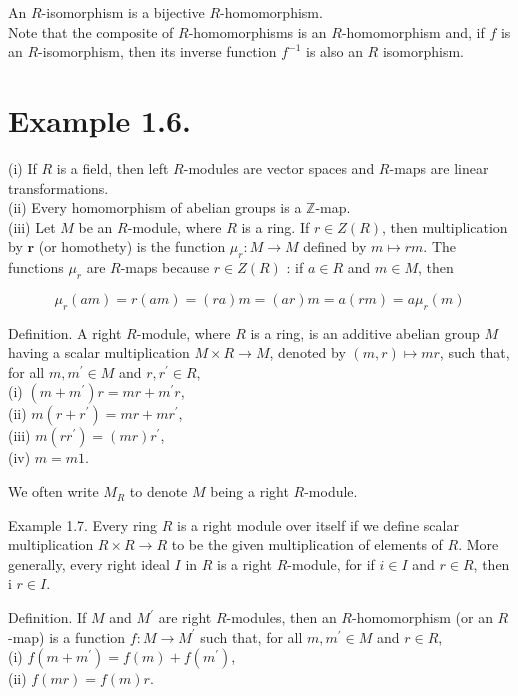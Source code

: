 \documentclass[10pt, letterpaper]{article}
\begin{document}
An $R$-isomorphism is a bijective $R$-homomorphism.\\
Note that the composite of $R$-homomorphisms is an $R$-homomorphism and, if $f$ is an $R$-isomorphism, then its inverse function $f^{-1}$ is also an $R$ isomorphism.

\section*{Example 1.6.}
(i) If $R$ is a field, then left $R$-modules are vector spaces and $R$-maps are linear transformations.\\
(ii) Every homomorphism of abelian groups is a $\mathbb{Z}$-map.\\
(iii) Let $M$ be an $R$-module, where $R$ is a ring. If $r \in Z(R)$, then multiplication by $\boldsymbol{r}$ (or homothety) is the function $\mu_{r}: M \rightarrow M$ defined by $m \mapsto r m$. The functions $\mu_{r}$ are $R$-maps because $r \in Z(R)$ : if $a \in R$ and $m \in M$, then

$$
\mu_{r}(a m)=r(a m)=(r a) m=(a r) m=a(r m)=a \mu_{r}(m)
$$

Definition. A right $R$-module, where $R$ is a ring, is an additive abelian group $M$ having a scalar multiplication $M \times R \rightarrow M$, denoted by $(m, r) \mapsto m r$, such that, for all $m, m^{\prime} \in M$ and $r, r^{\prime} \in R$,\\
(i) $\left(m+m^{\prime}\right) r=m r+m^{\prime} r$,\\
(ii) $m\left(r+r^{\prime}\right)=m r+m r^{\prime}$,\\
(iii) $m\left(r r^{\prime}\right)=(m r) r^{\prime}$,\\
(iv) $m=m 1$.

We often write $M_{R}$ to denote $M$ being a right $R$-module.

Example 1.7. Every ring $R$ is a right module over itself if we define scalar multiplication $R \times R \rightarrow R$ to be the given multiplication of elements of $R$. More generally, every right ideal $I$ in $R$ is a right $R$-module, for if $i \in I$ and $r \in R$, then i $r \in I$.

Definition. If $M$ and $M^{\prime}$ are right $R$-modules, then an $R$-homomorphism (or an $R$-map) is a function $f: M \rightarrow M^{\prime}$ such that, for all $m, m^{\prime} \in M$ and $r \in R$,\\
(i) $f\left(m+m^{\prime}\right)=f(m)+f\left(m^{\prime}\right)$,\\
(ii) $f(m r)=f(m) r$.
\end{document}
